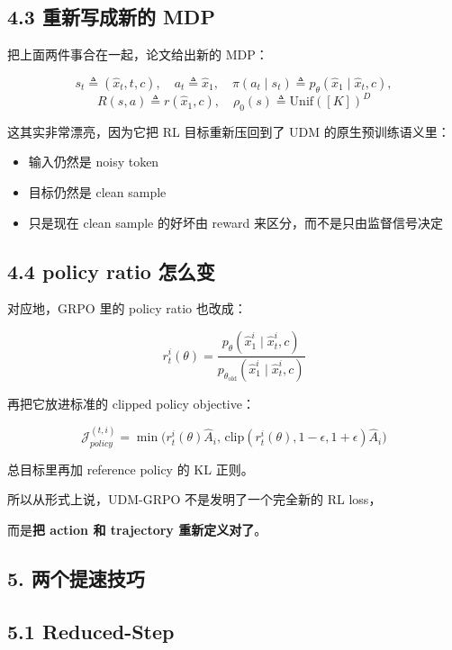 \subsection{4.3 重新写成新的 MDP}

把上面两件事合在一起，论文给出新的 MDP：

\[
s_t \triangleq (\hat{x}_t, t, c), \quad
a_t \triangleq \hat{x}_1, \quad
\pi(a_t \mid s_t) \triangleq p_\theta(\hat{x}_1 \mid \hat{x}_t, c),
\]
\[
R(s,a) \triangleq r(\hat{x}_1, c), \quad
\rho_0(s) \triangleq \mathrm{Unif}([K])^D
\]

这其实非常漂亮，因为它把 RL 目标重新压回到了 UDM 的原生预训练语义里：

\begin{itemize}[leftmargin=1.5em]
  \item 输入仍然是 noisy token
  \item 目标仍然是 clean sample
  \item 只是现在 clean sample 的好坏由 reward 来区分，而不是只由监督信号决定
\end{itemize}

\subsection{4.4 policy ratio 怎么变}

对应地，GRPO 里的 policy ratio 也改成：

\[
r_t^i(\theta)
=
\frac{p_\theta(\hat{x}_1^i \mid \hat{x}_t^i, c)}
{p_{\theta_{\mathrm{old}}}(\hat{x}_1^i \mid \hat{x}_t^i, c)}
\]

再把它放进标准的 clipped policy objective：

\[
\mathcal{J}_{policy}^{(t,i)}
=
\min\Big(
r_t^i(\theta)\hat{A}_i,\,
\mathrm{clip}(r_t^i(\theta), 1-\epsilon, 1+\epsilon)\hat{A}_i
\Big)
\]

总目标里再加 reference policy 的 KL 正则。

所以从形式上说，UDM-GRPO 不是发明了一个完全新的 RL loss，

而是\textbf{把 action 和 trajectory 重新定义对了}。

\subsection{5. 两个提速技巧}

\subsection{5.1 Reduced-Step}

